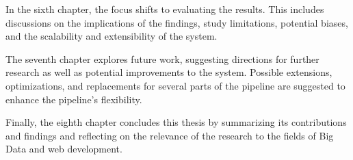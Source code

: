 In the sixth chapter, the focus shifts to evaluating the results.
This includes discussions on the implications of the findings, study limitations, potential biases, and the scalability and extensibility of the system.

The seventh chapter explores future work, suggesting directions for further research as well as potential improvements to the system.
Possible extensions, optimizations, and replacements for several parts of the pipeline are suggested to enhance the pipeline's flexibility.

Finally, the eighth chapter concludes this thesis by summarizing its contributions and findings and reflecting on the relevance of the research to the fields of Big Data and web development.
